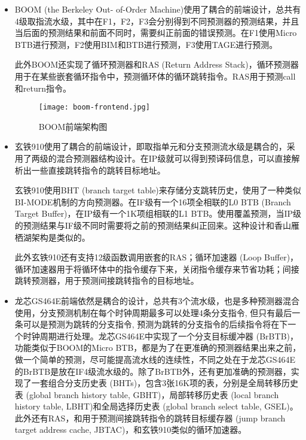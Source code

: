 \begin{itemize}[listparindent=2em]
	\item BOOM (the Berkeley Out-
    of-Order Machine)\cite{boom-spec, sonic-boom}使用了耦合的前端设计，总共有4级取指流水级，其中在F1，F2，F3会分别得到不同预测器的预测结果，并且当后面的预测结果和前面不同时，需要纠正前面的错误预测。在F1使用Micro BTB进行预测，F2使用BIM和BTB进行预测，F3使用TAGE进行预测。
    
    此外BOOM还实现了循环预测器和RAS (Return Address Stack)，循环预测器用于在某些嵌套循环指令中，预测循环体的循环跳转指令。RAS用于预测call和return指令。

    \begin{figure}[htb]
        \centering
        \setlength\tabcolsep{3pt}  %
        \vspace{5pt} %
        \texttt{[image: boom-frontend.jpg]}
        \caption{BOOM前端架构图\cite{boom-frontend}}
        \label{fig:figure11}
    \end{figure}

	\item 玄铁910\cite{xuantie}使用了耦合的前端设计，即取指单元和分支预测流水级是耦合的，采用了两级的混合预测器结构设计。在IP级就可以得到预译码信息，可以直接解析出一些直接跳转指令的跳转目标地址。

    玄铁910使用BHT (branch target table)来存储分支跳转历史，使用了一种类似BI-MODE\cite{bi-mode}机制的方向预测器。在IF级有一个16项全相联的L0 BTB (Branch Target Buffer)，在IP级有一个1K项组相联的L1 BTB。使用覆盖预测，当IP级的预测结果与IF级不同时需要将之前的预测结果纠正回来。这种设计和香山雁栖湖架构是类似的。

    此外玄铁910还有支持12级函数调用嵌套的RAS；循环加速器 (Loop Buffer)，循环加速器用于将循环体中的指令缓存下来，关闭指令缓存来节省功耗；间接跳转预测器，用于预测间接跳转指令的目标地址。

    \item 龙芯GS464E\cite{loongson}前端依然是耦合的设计，总共有3个流水级，也是多种预测器混合使用，分支预测机制在每个时钟周期最多可以处理4条分支指令, 但只有最后一条可以是预测为跳转的分支指令, 预测为跳转的分支指令的后续指令将在下一个时钟周期进行处理。龙芯GS464E中实现了一个分支目标缓冲器 (BrBTB)，功能类似于BOOM的Micro BTB，都是为了在更准确的预测器结果出来之前，做一个简单的预测，尽可能提高流水线的连续性，不同之处在于龙芯GS464E的BrBTB是放在IF4级流水级的。除了BrBTB外，还有更加准确的预测器，实现了一套组合分支历史表 (BHTs)，包含3张16K项的表，分别是全局转移历史表 (global branch history table, GBHT)，局部转移历史表 (local branch history table, LBHT)和全局选择历史表 (global branch select table, GSEL)。此外还有RAS，和用于预测间接跳转指令的跳转目标缓存器 (jump branch target address cache, JBTAC)，和玄铁910类似的循环加速器。
    

\end{itemize}
